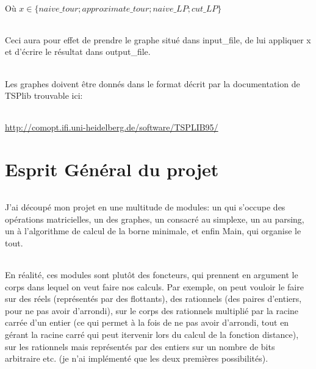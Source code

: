 \documentclass[a4paper]{article}
\begin{document}
\paragraph{}
Où $x \in \{ naive\_tour; approximate\_tour; naive\_LP; cut\_LP \}$

\paragraph{}
Ceci aura pour effet de prendre le graphe situé dans input\_file, de lui appliquer x et d'écrire le résultat dans output\_file.

\paragraph{}
Les graphes doivent être donnés dans le format décrit par la documentation de TSPlib trouvable ici:

\paragraph{}
\url{http://comopt.ifi.uni-heidelberg.de/software/TSPLIB95/}

\part{Esprit Général du projet}

\paragraph{}
J'ai découpé mon projet en une multitude de modules: un qui s'occupe des opérations matricielles, un des graphes, un consacré au simplexe, un au parsing, un à l'algorithme de calcul de la borne minimale, et enfin Main, qui organise le tout.

\paragraph{}
En réalité, ces modules sont plutôt des foncteurs, qui prennent en argument le corps dans lequel on veut faire nos calculs. Par exemple, on peut vouloir le faire sur des réels (représentés par des flottants), des rationnels (des paires d'entiers, pour ne pas avoir d'arrondi), sur le corps des rationnels multiplié par la racine carrée d'un entier (ce qui permet à la fois de ne pas avoir d'arrondi, tout en gérant la racine carré qui peut itervenir lors du calcul de la fonction distance), sur les rationnels mais représentés par des entiers sur un nombre de bits arbitraire etc. (je n'ai implémenté que les deux premières possibilités).
\end{document}

